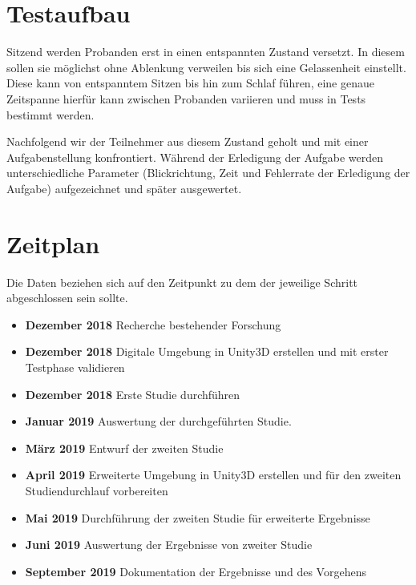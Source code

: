 \documentclass[a4paper, 11pt]{article}
\begin{document}
\section*{Testaufbau}
Sitzend werden Probanden erst in einen entspannten Zustand versetzt. In diesem sollen sie möglichst ohne Ablenkung verweilen bis sich eine Gelassenheit einstellt. Diese kann von entspanntem Sitzen bis hin zum Schlaf führen, eine genaue Zeitspanne hierfür kann zwischen Probanden variieren und muss in Tests bestimmt werden.

Nachfolgend wir der Teilnehmer aus diesem Zustand geholt und mit einer Aufgabenstellung konfrontiert. Während der Erledigung der Aufgabe werden unterschiedliche Parameter (Blickrichtung, Zeit und Fehlerrate der Erledigung der Aufgabe) aufgezeichnet und später ausgewertet.

\section*{Zeitplan}
Die Daten beziehen sich auf den Zeitpunkt zu dem der jeweilige Schritt abgeschlossen sein sollte.
\begin{itemize}
    \item \textbf{Dezember 2018} Recherche bestehender Forschung
    \item \textbf{Dezember 2018} Digitale Umgebung in Unity3D erstellen und mit erster Testphase validieren
    \item \textbf{Dezember 2018} Erste Studie durchführen
    \item \textbf{Januar 2019} Auswertung der durchgeführten Studie.
    \item \textbf{März 2019} Entwurf der zweiten Studie
    \item \textbf{April 2019} Erweiterte Umgebung in Unity3D erstellen und für den zweiten Studiendurchlauf vorbereiten
    \item \textbf{Mai 2019} Durchführung der zweiten Studie für erweiterte Ergebnisse
    \item \textbf{Juni 2019} Auswertung der Ergebnisse von zweiter Studie
    \item \textbf{September 2019} Dokumentation der Ergebnisse und des Vorgehens
\end{itemize}
\end{document}
